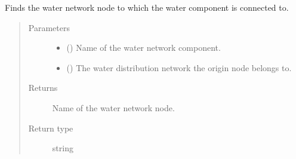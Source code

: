 \documentclass[letterpaper,10pt,english]{sphinxmanual}
\begin{document}
\begin{fulllineitems}
\label{\detokenize{apidoc:dreaminsg_integrated_model.src.network_sim_models.interdependencies.find_connected_water_node}}
\sphinxAtStartPar
Finds the water network node to which the water component is connected to.
\begin{quote}\begin{description}
\item[{Parameters}] \leavevmode\begin{itemize}
\item {} 
\sphinxAtStartPar
{} () \textendash{} Name of the water network component.

\item {} 
\sphinxAtStartPar
{} () \textendash{} The water distribution network the origin node belongs to.

\end{itemize}

\item[{Returns}] \leavevmode
\sphinxAtStartPar
Name of the water network node.

\item[{Return type}] \leavevmode
\sphinxAtStartPar
string

\end{description}\end{quote}

\end{fulllineitems}

\end{document}
